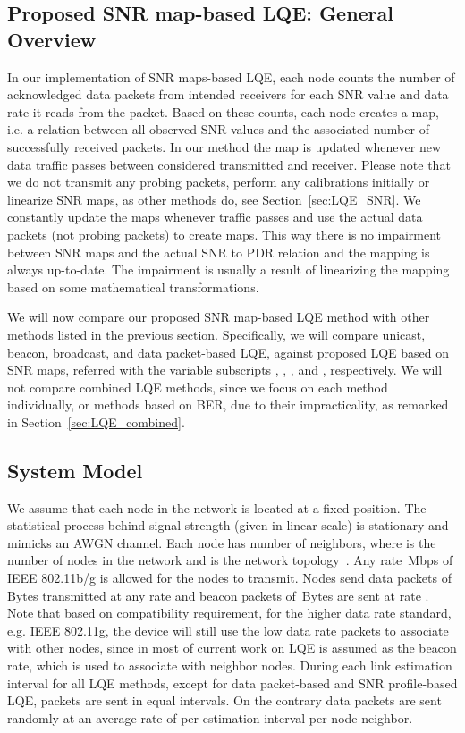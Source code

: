 \documentclass[11pt,draftclsnofoot,journal,onecolumn]{IEEEtran}
\begin{document}
\subsection{Proposed SNR map-based LQE: General Overview}
\label{sec:snr_maps_general_idea}

In our implementation of SNR maps-based LQE, each node counts the number of acknowledged data packets from intended receivers for each SNR value and data rate it reads from the packet. Based on these counts, each node creates a map, i.e. a relation between all observed SNR values and the associated number of successfully received packets. In our method the map is updated whenever new data traffic passes between considered transmitted and receiver. Please note that we do not transmit any probing packets, perform any calibrations initially or linearize SNR maps, as other methods do, see Section~\ref{sec:LQE_SNR}. We constantly update the maps whenever traffic passes and use the actual data packets (not probing packets) to create maps. This way there is no impairment between SNR maps and the actual SNR to PDR relation and the mapping is always up-to-date. The impairment is usually a result of linearizing the mapping based on some mathematical transformations.

We will now compare our proposed SNR map-based LQE method with other methods listed in the previous section. Specifically, we will compare unicast, beacon, broadcast, and data packet-based LQE, against proposed LQE based on SNR maps, referred with the variable subscripts , , ,  and , respectively. We will not compare combined LQE methods, since we focus on each method individually, or methods based on BER, due to their impracticality, as remarked in Section~\ref{sec:LQE_combined}.

\subsection{System Model}
\label{sec:system_model}

We assume that each node in the network is located at a fixed position. The statistical process behind signal strength (given in linear scale)  is stationary and mimicks an AWGN channel. Each node has  number of neighbors, where  is the number of nodes in the network and  is the network topology~\cite[Ch. 3]{Hekmat_phd_thesis}. Any rate \,Mbps of IEEE 802.11b/g is allowed for the nodes to transmit. Nodes send data packets of  Bytes transmitted at any rate  and beacon packets of \,Bytes are sent at rate . Note that based on compatibility requirement, for the higher data rate standard, e.g. IEEE 802.11g, the device will still use the low data rate packets to associate with other nodes, since in most of current work on LQE  is assumed as the beacon rate, which is used to associate with neighbor nodes. During each link estimation interval for all LQE methods, except for data packet-based and SNR profile-based LQE,  packets are sent in equal intervals. On the contrary data packets are sent randomly at an average rate of  per estimation interval per node neighbor.
\end{document}
